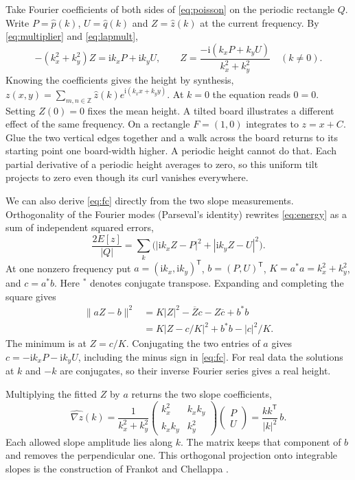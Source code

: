 \documentclass[11pt,a4paper]{article}
\numberwithin{equation}{section}
\newcommand{\ii}{\mathrm{i}}
\begin{document}
Take Fourier coefficients of both sides of \eqref{eq:poisson} on the periodic
rectangle $Q$. Write $P=\widehat p(k)$, $U=\widehat q(k)$ and
$Z=\widehat z(k)$ at the current frequency. By \eqref{eq:multiplier}
and \eqref{eq:lapmult},
\begin{equation}
 -(k_x^2+k_y^2)Z=\ii k_xP+\ii k_yU,\qquad
 \boxed{Z=\frac{-\ii(k_xP+k_yU)}{k_x^2+k_y^2}}\quad(k\ne0).
 \label{eq:fc}
\end{equation}
Knowing the coefficients gives the height by synthesis,
$z(x,y)=\sum_{m,n\in\mathbb Z}\widehat z(k)e^{\ii(k_x x+k_y y)}$.
At $k=0$ the equation reads $0=0$. Setting $Z(0)=0$ fixes the mean
height. A tilted board illustrates a different effect of the same frequency.
On a rectangle $F=(1,0)$ integrates to $z=x+C$. Glue the two vertical
edges together and a walk across the board returns to its starting point
one board-width higher. A periodic height cannot do that. Each partial
derivative of a periodic height averages to zero, so this uniform tilt
projects to zero even though its curl vanishes everywhere.

We can also derive \eqref{eq:fc} directly from the two slope measurements.
Orthogonality of the Fourier modes (Parseval's identity) rewrites
\eqref{eq:energy} as a sum of independent squared errors,
\begin{equation}
 \frac{2E[z]}{|Q|}=\sum_k\big(
   |\ii k_x Z-P|^2+|\ii k_y Z-U|^2\big).
\end{equation}
At one nonzero frequency put $a=(\ii k_x,\ii k_y)^\mathsf{T}$,
$b=(P,U)^\mathsf{T}$, $K=a^*a=k_x^2+k_y^2$, and $c=a^*b$.
Here $^*$ denotes conjugate transpose. Expanding and completing the square gives
\begin{align}
 \|aZ-b\|^2
 &=K|Z|^2-\overline Zc-Z\overline c+b^*b \nonumber\\
 &=K|Z-c/K|^2+b^*b-|c|^2/K .
 \label{eq:square}
\end{align}
The minimum is at $Z=c/K$. Conjugating the two entries of $a$ gives
$c=-\ii k_xP-\ii k_yU$, including the minus sign in \eqref{eq:fc}.
For real data the solutions at $k$ and $-k$ are conjugates, so their inverse
Fourier series gives a real height.

Multiplying the fitted $Z$ by $a$ returns the two slope coefficients,
\begin{equation}
 \widehat{\nabla z}(k)
 =\frac{1}{k_x^2+k_y^2}
 \begin{pmatrix}k_x^2&k_xk_y\\ k_xk_y&k_y^2\end{pmatrix}
 \begin{pmatrix}P\\U\end{pmatrix}
 =\frac{k k^\mathsf{T}}{|k|^2}\,b .
 \label{eq:projector}
\end{equation}
Each allowed slope amplitude lies along $k$. The matrix keeps that component
of $b$ and removes the perpendicular one. This orthogonal projection onto
integrable slopes is the construction of Frankot and Chellappa \cite{FC}.
\end{document}
